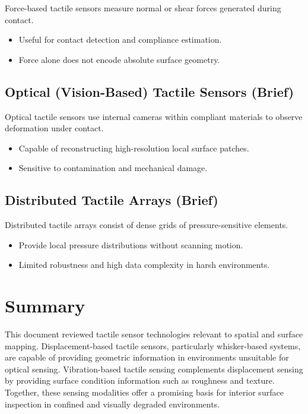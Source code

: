 \documentclass[11pt,a4paper]{article}
\begin{document}
Force-based tactile sensors measure normal or shear forces generated during contact.

\begin{itemize}
    \item Useful for contact detection and compliance estimation.
    \item Force alone does not encode absolute surface geometry.
\end{itemize}

\subsection{Optical (Vision-Based) Tactile Sensors (Brief)}

Optical tactile sensors use internal cameras within compliant materials to observe deformation under contact.

\begin{itemize}
    \item Capable of reconstructing high-resolution local surface patches.
    \item Sensitive to contamination and mechanical damage.
\end{itemize}

\subsection{Distributed Tactile Arrays (Brief)}

Distributed tactile arrays consist of dense grids of pressure-sensitive elements.

\begin{itemize}
    \item Provide local pressure distributions without scanning motion.
    \item Limited robustness and high data complexity in harsh environments.
\end{itemize}

\section{Summary}

This document reviewed tactile sensor technologies relevant to spatial and surface mapping. Displacement-based tactile sensors, particularly whisker-based systems, are capable of providing geometric information in environments unsuitable for optical sensing. Vibration-based tactile sensing complements displacement sensing by providing surface condition information such as roughness and texture. Together, these sensing modalities offer a promising basis for interior surface inspection in confined and visually degraded environments.
\end{document}
